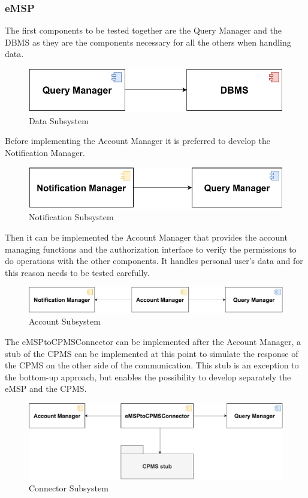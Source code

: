 \subsubsection{eMSP}
The first components to be tested together are the Query Manager and the DBMS as they are the components necessary for all the others when handling data.
\begin{figure}[H]
    \centering
    \includegraphics[scale=0.6]{src/Integration/eMSPQuery.pdf}
    \caption{Data Subsystem}
\end{figure}
Before implementing the Account Manager it is preferred to develop the Notification Manager.
\begin{figure}[H]
    \centering
    \includegraphics[scale=0.6]{src/Integration/eMSPNotification.pdf}
    \caption{Notification Subsystem}
\end{figure}
Then it can be implemented the Account Manager that provides the account managing functions and the authorization interface 
to verify the permissions to do operations with the other components. It handles personal user's data and for this reason needs
to be tested carefully.
\begin{figure}[H]
    \centering
    \includegraphics[scale=0.6]{src/Integration/eMSPAccount.pdf}
    \caption{Account Subsystem}
\end{figure}
The eMSPtoCPMSConnector can be implemented after the Account Manager, a stub of the CPMS can be implemented at this point to simulate
the response of the CPMS on the other side of the communication. This stub is an exception to the bottom-up approach, but
enables the possibility to develop separately the eMSP and the CPMS.
\begin{figure}[H]
    \centering
    \includegraphics[scale=0.6]{src/Integration/eMSPConnector.pdf}
    \caption{Connector Subsystem}
\end{figure}
